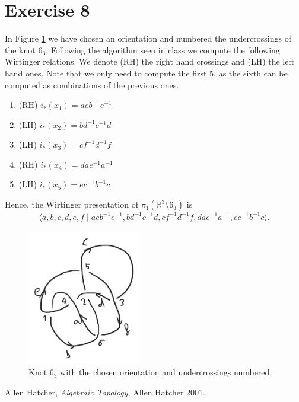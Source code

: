 \documentclass[11pt,a4paper]{article}
\newcommand{\R}{\mathbb R}
\begin{document}
\section*{Exercise 8}
In Figure \ref{fig:63} we have chosen an orientation and numbered the undercrossings of the knot $ 6_3 $. Following the algorithm seen in class we compute the following Wirtinger relations. We denote (RH) the right hand crossings and (LH) the left hand ones. Note that we only need to compute the first 5, as the sixth can be computed as combinations of the previous ones.
\renewcommand{\theenumi}{\arabic{enumi}} 
\begin{enumerate}
  \item (RH) $ i_*(x_1) = a e b^{-1} e^{-1} $
  \item (LH) $ i_*(x_2) = b d^{-1} c^{-1} d $
  \item (LH) $ i_*(x_3) = c f^{-1} d^{-1} f $
  \item (RH) $ i_*(x_4) = d a e^{-1} a^{-1} $
  \item (LH) $ i_*(x_5) = e c^{-1} b^{-1} c $
\end{enumerate}
Hence, the Wirtinger presentation of $ \pi_1 (\R^3 \setminus 6_3) $ is
$$
  \langle a, b, c, d, e, f \mid a e b^{-1} e^{-1}, b d^{-1} c^{-1} d, c f^{-1} d^{-1} f, d a e^{-1} a^{-1}, e c^{-1} b^{-1} c\rangle.
$$
\begin{figure}[h]
  \centering
  \includegraphics[width=5cm]{63.png}
  \caption{Knot $6_3$ with the chosen orientation and undercrossings numbered.}
  \label{fig:63}
\end{figure}

\begin{thebibliography}{9}

  Allen Hatcher,
  \textit{Algebraic Topology},
  Allen Hatcher 2001.
  
\end{thebibliography}
\end{document}
